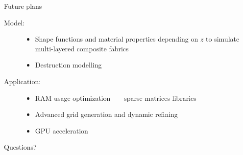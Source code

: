 \documentclass[10pt]{beamer}
\numberwithin{equation}{subsection}
\begin{document}
\begin{frame}{Future plans}
    \begin{description} 
        \item[Model:]
            \begin{itemize}
                \item Shape functions and material properties depending on $z$ 
                    to simulate multi-layered composite fabrics
                \item Destruction modelling
            \end{itemize}
            \vfill
        \item[Application:]
            \begin{itemize}
                \item RAM usage optimization~---~sparse matrices libraries
                \item Advanced grid generation and dynamic refining
                \item GPU acceleration
            \end{itemize}
    \end{description}
\end{frame}




{
\begin{frame}[standout]
  Questions?
\end{frame}
}
\end{document}
